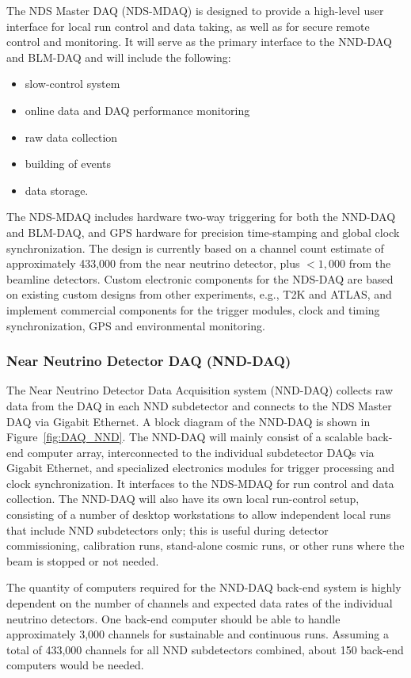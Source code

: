 The NDS Master DAQ (NDS-MDAQ) is designed to provide a high-level user interface 
for local run control and data taking, as well as for secure remote control and monitoring.   It will 
serve as the primary interface to the NND-DAQ and BLM-DAQ and will include the following:
\begin{itemize}
\item slow-control system 
\item online data and DAQ performance monitoring  
\item raw data collection
\item building of events
\item data storage.   
\end{itemize}
The NDS-MDAQ includes hardware two-way triggering for both the NND-DAQ and BLM-DAQ, and 
GPS hardware for precision time-stamping and global clock synchronization. 
The design is currently based on a channel count estimate of approximately 433,000 
from the near neutrino detector, plus $<1,000$ 
from the beamline detectors.  Custom electronic components for the NDS-DAQ are based on existing 
custom designs from other experiments, e.g., T2K and ATLAS, and 
implement commercial components for the trigger modules, clock and timing synchronization, 
GPS and environmental monitoring.


\subsubsection{Near Neutrino Detector DAQ (NND-DAQ)} 
\label{cdrsec:nd:nnd:daq}


The Near Neutrino Detector Data Acquisition system (NND-DAQ) collects raw data from 
the DAQ in each NND subdetector and connects to the 
NDS Master DAQ via Gigabit Ethernet. A block diagram of the NND-DAQ is
shown in Figure~\ref{fig:DAQ_NND}. The NND-DAQ will mainly consist 
of a scalable back-end computer array, interconnected to the individual 
subdetector DAQs via Gigabit Ethernet, and specialized electronics modules for trigger 
processing and clock synchronization. It interfaces to the NDS-MDAQ for 
run control and data collection. The NND-DAQ will also have its own local run-control setup, 
consisting of a number of desktop workstations to allow independent local runs that include 
NND subdetectors only; this is useful during detector commissioning, calibration runs, 
stand-alone cosmic runs, or other runs where the beam is stopped or not needed.

The quantity of computers required for the NND-DAQ back-end system is highly dependent on the 
number of channels and expected data rates of the individual neutrino detectors. 
One back-end computer should be able to handle 
approximately 3,000 channels for sustainable and continuous runs. Assuming a total of 
433,000 channels for all NND subdetectors combined, about 150 back-end computers would be 
needed.

